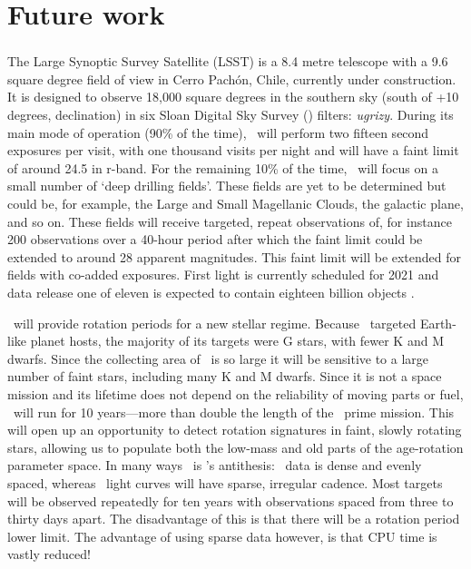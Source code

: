 \chapter{Future work}
\label{chapter:future}

\subsection{\LSST}

The Large Synoptic Survey Satellite (LSST) is a 8.4 metre telescope with a 9.6
square degree field of view in Cerro Pach\'{o}n, Chile, currently under
construction.
It is designed to observe 18,000 square degrees in the southern sky (south of
+10 degrees, declination) in six Sloan Digital Sky Survey (\SDSS) filters:
{\it ugrizy}.
During its main mode of operation (90\% of the time), \LSST\ will perform two
fifteen second exposures per visit, with one thousand visits per night and
will have a faint limit of around 24.5 in r-band.
For the remaining 10\% of the time, \LSST\ will focus on a small number of
`deep drilling fields'.
These fields are yet to be determined but could be, for example, the Large and
Small Magellanic Clouds, the galactic plane, and so on.
These fields will receive targeted, repeat observations of, for instance 200
observations over a 40-hour period after which the faint limit could be
extended to around 28 apparent magnitudes.
This faint limit will be extended for fields with co-added exposures.
First light is currently scheduled for 2021 and data release one of eleven is
expected to contain eighteen billion objects \citep{Ivezic2008}.

\LSST\ will provide rotation periods for a new stellar regime.
Because \kepler\ targeted Earth-like planet hosts, the majority of its
targets were G stars, with fewer K and M dwarfs.
Since the collecting area of \LSST\ is so large it will be sensitive to a
large number of faint stars, including many K and M dwarfs.
Since it is not a space mission and its lifetime does not depend on the
reliability of moving parts or fuel, \LSST\ will run for 10 years---more than
double the length of the \kepler\ prime mission.
This will open up an opportunity to detect rotation signatures in faint,
slowly rotating stars, allowing us to populate both the low-mass and old parts
of the age-rotation parameter space.
In many ways \LSST\ is \kepler's antithesis: \kepler\ data is dense and evenly
spaced, whereas \LSST\ light curves will have sparse, irregular cadence.
Most targets will be observed repeatedly for ten years with observations
spaced from three to thirty days apart.
The disadvantage of this is that there will be a rotation period lower limit.
The advantage of using sparse data however, is that CPU time is vastly
reduced!

